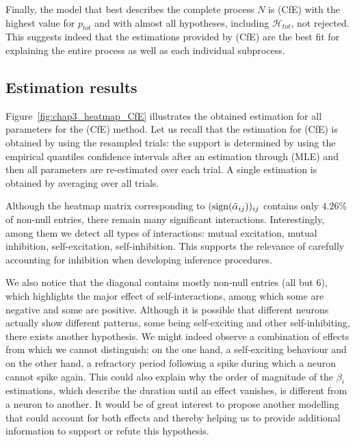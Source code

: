  Finally, the model that best describes the complete process $N$ is (CfE) with the highest value for $p_{tot}$ and with almost all hypotheses, including $\mathcal{H}_{tot}$, not rejected. This suggests indeed that the estimations provided by (CfE) are the best fit for explaining the entire process as well as each individual subprocess.

\subsection{Estimation results} \label{sec:chap3_comment_neuron}
Figure~\ref{fig:chap3_heatmap_CfE} illustrates the obtained estimation for all parameters for the (CfE) method. 
Let us recall that the estimation for (CfE) is obtained by using the resampled trials: the support is determined by using the empirical quantiles confidence intervals after an estimation through (MLE) and then all parameters are re-estimated over each trial. A single estimation is obtained by averaging over all trials.

Although the heatmap matrix corresponding to $(\operatorname{sign}(\tilde\alpha_{ij}))_{ij}$ contains only $4.26\%$ of non-null entries, there remain many significant interactions. Interestingly, among them we detect all types of interactions: mutual excitation, mutual inhibition, self-excitation, self-inhibition. This supports the relevance of carefully accounting for inhibition when developing inference procedures.

We also notice that the diagonal contains mostly non-null entries (all but $6$), which highlights the major effect of self-interactions, among which some are negative and some are positive. Although it is possible that different neurons actually show different patterns, some being self-exciting and other self-inhibiting, there exists another hypothesis.  We might indeed observe a combination of effects from which we cannot distinguish: on the one hand, a self-exciting behaviour and on the other hand, a refractory period following a spike during which a neuron cannot spike again. This could also explain why the order of magnitude of the $\beta_i$ estimations, which describe the duration until an effect vanishes, is different from a neuron to another. It would be of great interest to propose another modelling that could account for both effects and thereby helping us to provide additional information to support or refute this hypothesis.

